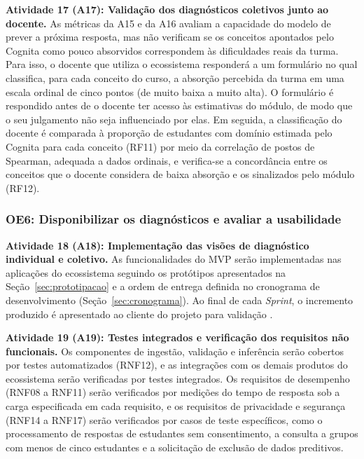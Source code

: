 \textbf{Atividade 17 (A17): Validação dos diagnósticos coletivos junto ao docente.} As métricas da A15 e da A16 avaliam a capacidade do modelo de prever a próxima resposta, mas não verificam se os conceitos apontados pelo Cognita como pouco absorvidos correspondem às dificuldades reais da turma. Para isso, o docente que utiliza o ecossistema responderá a um formulário no qual classifica, para cada conceito do curso, a absorção percebida da turma em uma escala ordinal de cinco pontos (de muito baixa a muito alta). O formulário é respondido antes de o docente ter acesso às estimativas do módulo, de modo que o seu julgamento não seja influenciado por elas. Em seguida, a classificação do docente é comparada à proporção de estudantes com domínio estimada pelo Cognita para cada conceito (RF11) por meio da correlação de postos de Spearman, adequada a dados ordinais, e verifica-se a concordância entre os conceitos que o docente considera de baixa absorção e os sinalizados pelo módulo (RF12).

\subsubsection{OE6: Disponibilizar os diagnósticos e avaliar a usabilidade}
\label{subsubsec:oe6}

\textbf{Atividade 18 (A18): Implementação das visões de diagnóstico individual e coletivo.} As funcionalidades do MVP serão implementadas nas aplicações do ecossistema seguindo os protótipos apresentados na Seção~\ref{sec:prototipacao} e a ordem de entrega definida no cronograma de desenvolvimento (Seção~\ref{sec:cronograma}). Ao final de cada \textit{Sprint}, o incremento produzido é apresentado ao cliente do projeto para validação \cite{schwaber_scrum_2020}.

\textbf{Atividade 19 (A19): Testes integrados e verificação dos requisitos não funcionais.} Os componentes de ingestão, validação e inferência serão cobertos por testes automatizados (RNF12), e as integrações com os demais produtos do ecossistema serão verificadas por testes integrados. Os requisitos de desempenho (RNF08 a RNF11) serão verificados por medições do tempo de resposta sob a carga especificada em cada requisito, e os requisitos de privacidade e segurança (RNF14 a RNF17) serão verificados por casos de teste específicos, como o processamento de respostas de estudantes sem consentimento, a consulta a grupos com menos de cinco estudantes e a solicitação de exclusão de dados preditivos.

